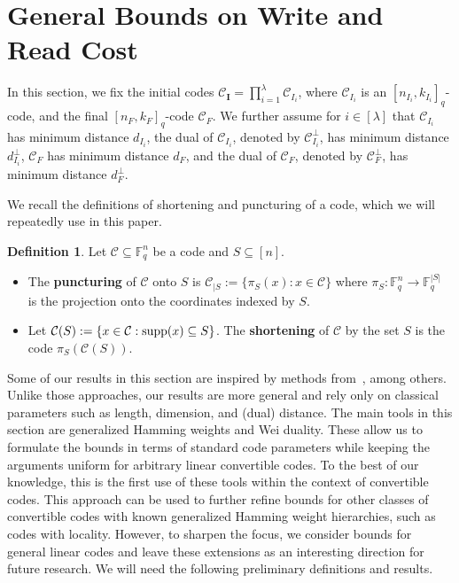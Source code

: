 \documentclass[conference, 10pt]{IEEEtran}
\theoremstyle{plain}
\theoremstyle{definition}
\newtheorem{definition}{Definition}
\newcommand{\numberset}{\mathbb}
\newcommand{\F}{\numberset{F}}
\newcommand{\supp}{\textup{supp}}
\newcommand{\mC}{\mathcal{C}}
\begin{document}
\section{General Bounds on Write and Read Cost} \label{sec:gen}
In this section, we fix the initial codes $\mC_{\textbf{I}}=\prod_{i=1}^{\lambda}\mC_{I_i}$, where $\mC_{I_i}$ is an $[n_{I_i},k_{I_i}]_q$-code, and the final $[n_F,k_F]_q$-code $\mC_F$. We further assume for $i\in [\lambda]$ that $\mC_{I_i}$ has minimum distance $d_{I_i}$, the dual of $\mC_{I_i}$, denoted by $\mC_{I_i}^\perp$, has minimum distance $d_{I_i}^\perp$, $\mC_F$ has minimum distance $d_F$, and the dual of $\mC_F$, denoted by $\mC_F^\perp$, has minimum distance $d_F^\perp$.

We recall the definitions of shortening and puncturing of a code, which we will repeatedly use in this paper.
\begin{definition} \label{short/punct}
    Let $\mC \subseteq \F_q^n$ be a code and $S \subseteq [n]$. 
    \begin{itemize}
        \item[(i)] The \textbf{puncturing} of $\mC$ onto $S$ is $\mC_{|S}:=\{ \pi_S(x): x \in \mC\}$ where $\pi_S:\F_q^n \to \F_q^{|S|}$ is the projection onto the coordinates indexed by $S$.
        \item[(ii)] Let $\mC(S):=\{x \in \mC : \supp(x) \subseteq S\}$. The \textbf{shortening} of $\mC$ by the set $S$ is the code $\pi_S(\mC(S))$.
    \end{itemize}
\end{definition}

Some of our results in this section are inspired by methods from~\cite{ge2025locally, shi2025bounds, kong2024locally}, among others. Unlike those approaches, 
our results are more general and rely only on classical parameters such as length, dimension, and (dual) distance.
The main tools in this section are generalized Hamming weights and Wei duality. These allow us to formulate the bounds in terms of standard code parameters while keeping the arguments uniform for arbitrary linear convertible codes. To the best of our knowledge, this is the first use of these tools within the context of convertible codes. This approach can be used to further refine bounds for other classes of convertible codes with known generalized Hamming weight hierarchies, such as codes with locality. However, to sharpen the focus, we consider bounds for general linear codes and leave these extensions as an interesting direction for future research. We will need the following preliminary definitions and results. 
\end{document}
